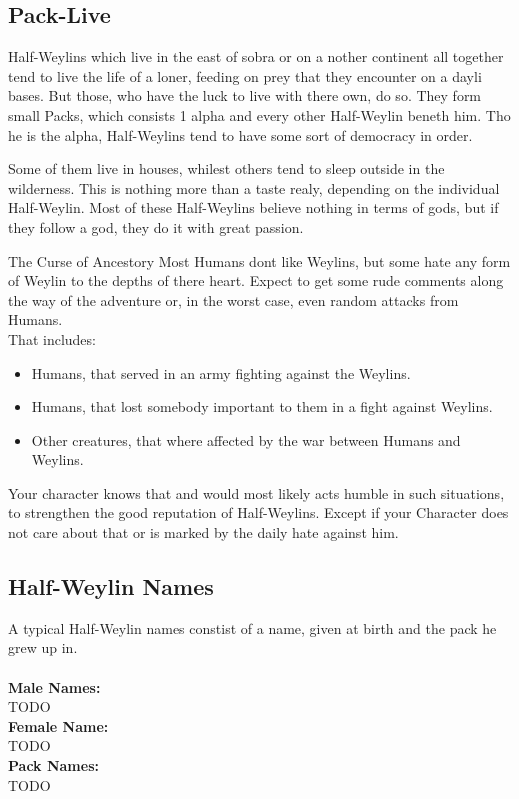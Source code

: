 \documentclass[10pt,twoside,twocolumn,openany]{book}
\begin{document}
\subsection{Pack-Live}
Half-Weylins which live in the east of sobra or on a nother continent all together tend to live the life of a loner, feeding on prey that they encounter on a dayli bases. But those, who have the luck to live with there own, do so. They form small Packs, which consists 1 alpha and every other Half-Weylin beneth him. Tho he is the alpha, Half-Weylins tend to have some sort of democracy in order.

Some of them live in houses, whilest others tend to sleep outside in the wilderness. This is nothing more than a taste realy, depending on the individual Half-Weylin. Most of these Half-Weylins believe nothing in terms of gods, but if they follow a god, they do it with great passion.

\begin{paperbox}{The Curse of Ancestory}
Most Humans dont like Weylins, but some hate any form of Weylin to the depths of there heart. Expect to get some rude comments along the way of the adventure or, in the worst case, even random attacks from Humans.\\
That includes: 
\begin{itemize}
\item Humans, that served in an army fighting against the Weylins.
\item Humans, that lost somebody important to them in a fight against Weylins.
\item Other creatures, that where affected by the war between Humans and Weylins.
\end{itemize}
Your character knows that and would most likely acts humble in such situations, to strengthen the good reputation of Half-Weylins. Except if your Character does not care about that or is marked by the daily hate against him.
\end{paperbox}
\subsection{Half-Weylin Names}
A typical Half-Weylin names constist of a name, given at birth and the pack he grew up in.\\\\
\textbf{Male Names:}\\
TODO\\
\textbf{Female Name:}\\
TODO\\
\textbf{Pack Names:}\\
TODO\\
\end{document}

